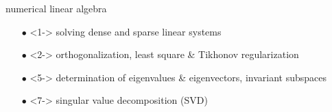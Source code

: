 \documentclass{beamer}
\begin{document}
\begin{frame}{numerical linear algebra}

\begin{itemize}
    \item[$\bullet$]<1-> solving dense and sparse linear systems
    \item[$\bullet$]<2-> orthogonalization, least square \& Tikhonov regularization
    \item[$\bullet$]<5-> determination of eigenvalues \& eigenvectors, invariant subspaces
    \item[$\bullet$]<7-> singular value decomposition (SVD)
\end{itemize}    





\end{frame}
\end{document}
